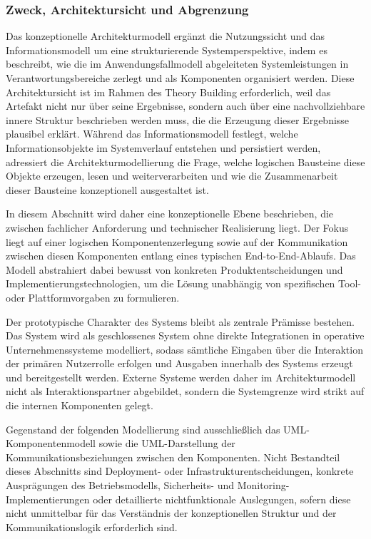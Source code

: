 \subsubsection{Zweck, Architektursicht und Abgrenzung}
Das konzeptionelle Architekturmodell ergänzt die Nutzungssicht und das Informationsmodell um eine strukturierende Systemperspektive, indem es beschreibt, wie die im Anwendungsfallmodell abgeleiteten Systemleistungen in Verantwortungsbereiche zerlegt und als Komponenten organisiert werden. Diese Architektursicht ist im Rahmen des Theory Building erforderlich, weil das Artefakt nicht nur über seine Ergebnisse, sondern auch über eine nachvollziehbare innere Struktur beschrieben werden muss, die die Erzeugung dieser Ergebnisse plausibel erklärt. \cite{nunamaker1990}
Während das Informationsmodell festlegt, welche Informationsobjekte im Systemverlauf entstehen und persistiert werden, adressiert die Architekturmodellierung die Frage, welche logischen Bausteine diese Objekte erzeugen, lesen und weiterverarbeiten und wie die Zusammenarbeit dieser Bausteine konzeptionell ausgestaltet ist.

In diesem Abschnitt wird daher eine konzeptionelle Ebene beschrieben, die zwischen fachlicher Anforderung und technischer Realisierung liegt. Der Fokus liegt auf einer logischen Komponentenzerlegung sowie auf der Kommunikation zwischen diesen Komponenten entlang eines typischen End-to-End-Ablaufs. Das Modell abstrahiert dabei bewusst von konkreten Produktentscheidungen und Implementierungstechnologien, um die Lösung unabhängig von spezifischen Tool- oder Plattformvorgaben zu formulieren.

Der prototypische Charakter des Systems bleibt als zentrale Prämisse bestehen. Das System wird als geschlossenes System ohne direkte Integrationen in operative Unternehmenssysteme modelliert, sodass sämtliche Eingaben über die Interaktion der primären Nutzerrolle erfolgen und Ausgaben innerhalb des Systems erzeugt und bereitgestellt werden. Externe Systeme werden daher im Architekturmodell nicht als Interaktionspartner abgebildet, sondern die Systemgrenze wird strikt auf die internen Komponenten gelegt.

Gegenstand der folgenden Modellierung sind ausschließlich das UML-Komponentenmodell sowie die UML-Darstellung der Kommunikationsbeziehungen zwischen den Komponenten. Nicht Bestandteil dieses Abschnitts sind Deployment- oder Infrastrukturentscheidungen, konkrete Ausprägungen des Betriebsmodells, Sicherheits- und Monitoring-Implementierungen oder detaillierte nichtfunktionale Auslegungen, sofern diese nicht unmittelbar für das Verständnis der konzeptionellen Struktur und der Kommunikationslogik erforderlich sind.


